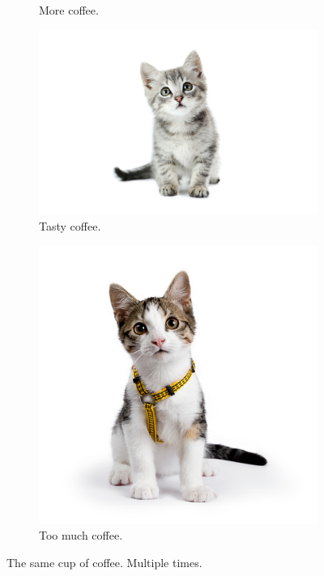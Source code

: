 \documentclass[12pt]{article}
\begin{document}
\begin{figure}[h!]
\begin{subfigure}[b]{0.3\linewidth}
    \caption{More coffee.}
  \end{subfigure}
  \begin{subfigure}[b]{0.3\linewidth}
    \includegraphics[width=\linewidth]{./kitten4.jpg}
    \caption{Tasty coffee.}
  \end{subfigure}
  \begin{subfigure}[b]{0.5\linewidth}
    \includegraphics[width=\linewidth]{./kitten5.jpg}
    \caption{Too much coffee.}
  \end{subfigure}
  \caption{The same cup of coffee. Multiple times.}
  \label{fig:coffee3}
\end{figure}
\end{document}
